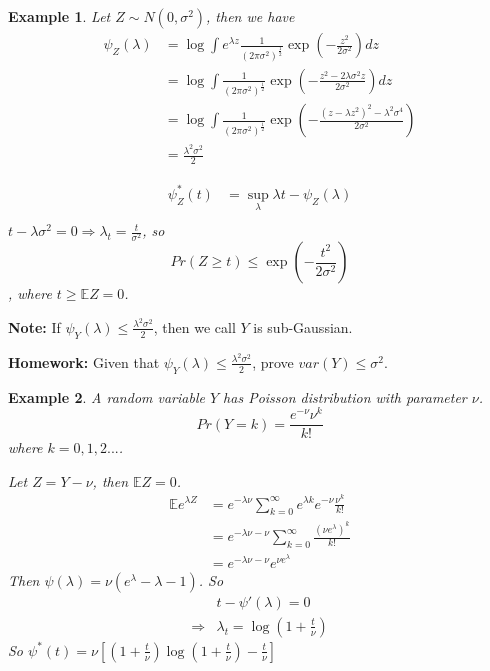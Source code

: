 \documentclass[11pt]{article}
\def\BE{{\mathbb E}}
\newtheorem{example}{Example}[section]
\begin{document}
\begin{example}
Let $Z \sim N(0, \sigma^2)$, then we have
\[\begin{split}
\psi_Z(\lambda) &= \log\int e^{\lambda z} \frac{1}{(2\pi\sigma^2)^{\frac{1}{2}}} \exp(-\frac{z^2}{2\sigma^2}) dz \\
&= \log \int \frac{1}{(2\pi\sigma^2)^{\frac{1}{2}}} \exp(-\frac{z^2 - 2\lambda\sigma^2 z}{2\sigma^2}) dz \\
&= \log \int \frac{1}{(2\pi\sigma^2)^{\frac{1}{2}}} \exp(-\frac{(z-\lambda z^2)^2 - \lambda^2 \sigma^4}{2\sigma^2})  \\
&= \frac{\lambda^2 \sigma^2}{2}
\end{split}\]

\[\begin{split}
\psi_Z^*(t) &= \sup_\lambda \lambda t - \psi_Z(\lambda) \\
\end{split}\]
$t - \lambda\sigma^2 = 0 \Rightarrow \lambda_t = \frac{t}{\sigma^2}$, so \[Pr({Z \geq t}) \leq \exp(-\frac{t^2}{2\sigma^2}) \], where $t \geq \BE Z = 0$.

\end{example}

\textbf{Note:} If $\psi_Y(\lambda) \leq \frac{\lambda^2\sigma^2}{2}$, then we call $Y$ is sub-Gaussian.

\textbf{Homework:} Given that $\psi_Y(\lambda) \leq \frac{\lambda^2\sigma^2}{2}$, prove $var(Y) \leq \sigma^2$.

\begin{example}
A random variable $Y$ has Poisson distribution with parameter $\nu$. \[
Pr(Y = k) = \frac{e^{-\nu} \nu^k}{k!} \]
where $ k = 0, 1, 2...$.

Let $Z = Y - \nu$, then $\BE Z = 0$.
\[\begin{split}
\BE e^{\lambda Z} & = e^{-\lambda \nu} \sum_{k=0}^\infty e^{\lambda k} e^{-\nu} \frac{\nu^k}{k!} \\
&= e^{-\lambda \nu -\nu} \sum_{k=0}^\infty \frac{(\nu e^\lambda)^k}{k!} \\
&= e^{-\lambda \nu - \nu} e^{\nu e^\lambda}
\end{split}\]
Then $\psi(\lambda) = \nu(e^\lambda - \lambda - 1)$.
So
\[\begin{split}
& t - \psi'(\lambda) = 0 \\
\Rightarrow & \lambda_t = \log(1 + \frac{t}{\nu})
\end{split}\]
So $\psi^*(t) = \nu[(1 + \frac{t}{\nu}) \log(1 + \frac{t}{\nu}) - \frac{t}{\nu}]$
\end{example}
\end{document}
